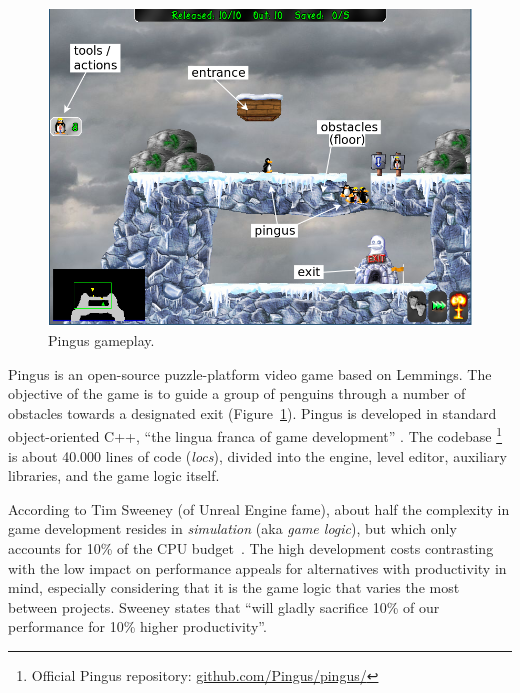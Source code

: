 \documentclass[10pt, conference, compsocconf]{IEEEtran}
\newcommand{\locs}{\emph{locs}\xspace}
\begin{document}
\begin{figure}
\centering
\includegraphics[width=\columnwidth]{pingus-annotations}
\caption{Pingus gameplay.
\label{fig.pingus}
}
\end{figure}

Pingus is an open-source puzzle-platform video game based on Lemmings.
The objective of the game is to guide a group of penguins through a number of
obstacles towards a designated exit (Figure~\ref{fig.pingus}).
%
Pingus is developed in standard object-oriented C++, ``the lingua franca of
game development'' \cite{games.patterns}.
The codebase%
\footnote{Official Pingus repository: \url{github.com/Pingus/pingus/}}
is about 40.000 lines of code (\locs), divided into
the engine, level editor, auxiliary libraries, and the game logic itself.

According to Tim Sweeney (of Unreal Engine fame), about half the complexity in
game development resides in \emph{simulation} (aka \emph{game logic}), but
which only accounts for 10\% of the CPU budget~\cite{games.sweeney}.
The high development costs contrasting with the low impact on performance
appeals for alternatives with productivity in mind, especially considering that
it is the game logic that varies the most between projects.
Sweeney states that ``will gladly sacrifice 10\% of our performance for 10\%
higher productivity''.

\end{document}
